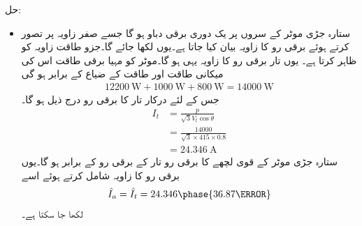 حل:
\begin{itemize}
\item
ستارہ جڑی موٹر کے سروں پر یک دوری برقی دباو   ہو گا جسے صفر زاویہ پر تصور کرتے ہوئے برقی رو کا زاویہ بیان کیا جاتا ہے۔یوں  لکھا جائے گا۔جزو طاقت  زاویہ   کو ظاہر کرتا ہے۔ یوں تار برقی رو کا  زاویہ یہی ہو گا۔موٹر کو مہیا برقی طاقت اس کی میکانی طاقت اور طاقت کے ضیاع کے برابر ہو گی
\begin{align*}
\SI{12200}{\watt}+\SI{1000}{\watt}+\SI{800}{\watt}=\SI{14000}{\watt}
\end{align*}
جس  کے لئے درکار تار کا برقی رو درج ذیل ہو گا۔ 
\begin{align*}
I_t&=\frac{p}{\sqrt{3} V_{t} \cos \theta}\\
&=\frac{\num{14000}}{\sqrt{3} \times 415 \times 0.8}\\
&=\SI{24.346}{\ampere}
\end{align*}
ستارہ جڑی موٹر کے قوی لچھے کا برقی رو تار کے برقی رو کے برابر ہو گا۔یوں برقی رو کا زاویہ شامل کرتے ہوئے اسے 
\begin{align*}
\hat{I}_a=\hat{I}_t=24.346 \phase {36.87 \degree}
\end{align*}
لکھا جا سکتا ہے۔


\end{itemize}
